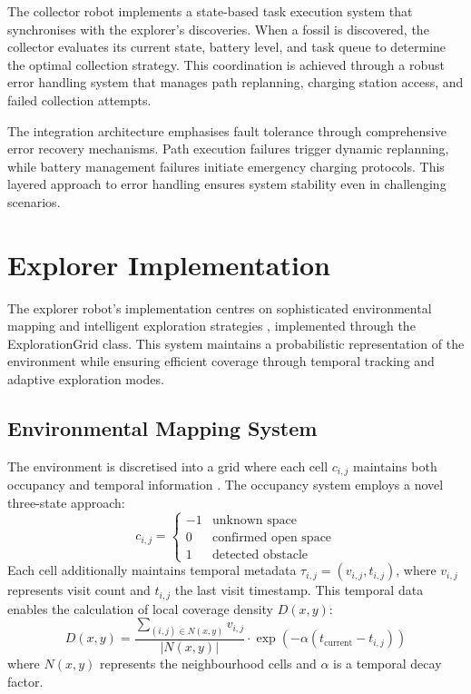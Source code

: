 \documentclass{csfourzero}
\begin{document}
The collector robot implements a state-based task execution system that synchronises with the explorer's discoveries. When a fossil is discovered, the collector evaluates its current state, battery level, and task queue to determine the optimal collection strategy. This coordination is achieved through a robust error handling system that manages path replanning, charging station access, and failed collection attempts.

The integration architecture emphasises fault tolerance through comprehensive error recovery mechanisms. Path execution failures trigger dynamic replanning, while battery management failures initiate emergency charging protocols. This layered approach to error handling ensures system stability even in challenging scenarios.

\section{Explorer Implementation}

The explorer robot's implementation centres on sophisticated environmental mapping and intelligent exploration strategies \cite{Thrun2003}, implemented through the ExplorationGrid class. This system maintains a probabilistic representation of the environment while ensuring efficient coverage through temporal tracking and adaptive exploration modes.

\subsection{Environmental Mapping System}

The environment is discretised into a grid where each cell $c_{i,j}$ maintains both occupancy and temporal information \cite{burgard2002coordinated}. The occupancy system employs a novel three-state approach:
\[
c_{i,j} = \begin{cases} 
-1 & \text{unknown space} \\
0 & \text{confirmed open space} \\
1 & \text{detected obstacle}
\end{cases}
\]
Each cell additionally maintains temporal metadata $\tau_{i,j} = (v_{i,j}, t_{i,j})$, where $v_{i,j}$ represents visit count and $t_{i,j}$ the last visit timestamp. This temporal data enables the calculation of local coverage density $D(x,y)$:
\[
D(x,y) = \frac{\sum_{(i,j) \in N(x,y)} v_{i,j}}{|N(x,y)|} \cdot \exp(-\alpha(t_{\text{current}} - t_{i,j}))
\]
where $N(x,y)$ represents the neighbourhood cells and $\alpha$ is a temporal decay factor.
\end{document}
